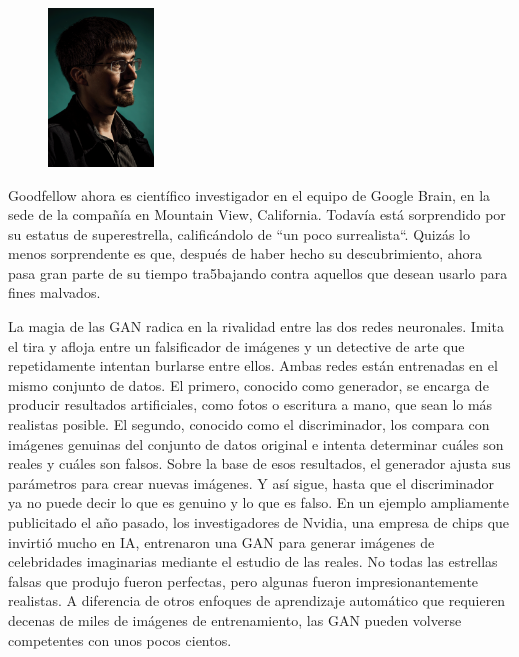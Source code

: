 \documentclass[a4paper]{article}
\begin{document}
\begin{figure} %
    \centering
    \includegraphics[width=0.25\textwidth]{./images/ma18-iangoodfellow2a.png}
\end{figure}


Goodfellow ahora es científico investigador en el equipo de Google 
Brain, en la sede de la compañía en Mountain View,
California. Todavía está sorprendido por su estatus de 
superestrella, calificándolo de ``un poco surrealista``. Quizás lo 
menos sorprendente es que, después de haber hecho su 
descubrimiento, ahora pasa gran parte de su tiempo tra5bajando 
contra aquellos que desean usarlo para fines malvados.

La magia de las GAN radica en la rivalidad entre las dos redes 
neuronales. Imita el tira y afloja entre un falsificador de 
imágenes y un detective de arte que repetidamente intentan 
burlarse entre ellos. Ambas redes están entrenadas en el mismo 
conjunto de datos. El primero, conocido como generador, se encarga 
de producir resultados artificiales, como fotos o escritura a 
mano, que sean lo más realistas posible. El segundo, conocido como 
el discriminador, los compara con imágenes genuinas del conjunto 
de datos original e intenta determinar cuáles son reales y cuáles 
son falsos. Sobre la base de esos resultados, el generador ajusta 
sus parámetros para crear nuevas imágenes. Y así sigue, hasta que 
el discriminador ya no puede decir lo que es genuino y lo que es 
falso.
En un ejemplo ampliamente publicitado el año pasado, los 
investigadores de Nvidia, una empresa de chips que invirtió mucho 
en IA, entrenaron una GAN para generar imágenes de celebridades 
imaginarias mediante el estudio de las reales. No todas las 
estrellas falsas que produjo fueron perfectas, pero algunas fueron 
impresionantemente realistas. A diferencia de otros enfoques de 
aprendizaje automático que requieren decenas de miles de imágenes 
de entrenamiento, las GAN pueden volverse competentes con unos 
pocos cientos.
\end{document}
